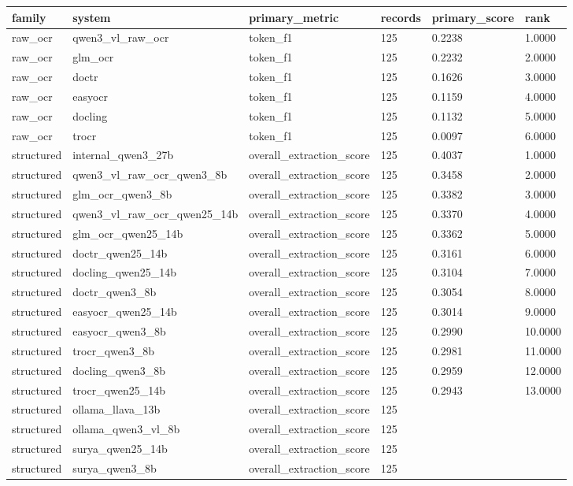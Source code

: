 \begin{tabular}{llllll}
\toprule
family & system & primary\_metric & records & primary\_score & rank \\
\midrule
raw\_ocr & qwen3\_vl\_raw\_ocr & token\_f1 & 125 & 0.2238 & 1.0000 \\
raw\_ocr & glm\_ocr & token\_f1 & 125 & 0.2232 & 2.0000 \\
raw\_ocr & doctr & token\_f1 & 125 & 0.1626 & 3.0000 \\
raw\_ocr & easyocr & token\_f1 & 125 & 0.1159 & 4.0000 \\
raw\_ocr & docling & token\_f1 & 125 & 0.1132 & 5.0000 \\
raw\_ocr & trocr & token\_f1 & 125 & 0.0097 & 6.0000 \\
structured & internal\_qwen3\_27b & overall\_extraction\_score & 125 & 0.4037 & 1.0000 \\
structured & qwen3\_vl\_raw\_ocr\_qwen3\_8b & overall\_extraction\_score & 125 & 0.3458 & 2.0000 \\
structured & glm\_ocr\_qwen3\_8b & overall\_extraction\_score & 125 & 0.3382 & 3.0000 \\
structured & qwen3\_vl\_raw\_ocr\_qwen25\_14b & overall\_extraction\_score & 125 & 0.3370 & 4.0000 \\
structured & glm\_ocr\_qwen25\_14b & overall\_extraction\_score & 125 & 0.3362 & 5.0000 \\
structured & doctr\_qwen25\_14b & overall\_extraction\_score & 125 & 0.3161 & 6.0000 \\
structured & docling\_qwen25\_14b & overall\_extraction\_score & 125 & 0.3104 & 7.0000 \\
structured & doctr\_qwen3\_8b & overall\_extraction\_score & 125 & 0.3054 & 8.0000 \\
structured & easyocr\_qwen25\_14b & overall\_extraction\_score & 125 & 0.3014 & 9.0000 \\
structured & easyocr\_qwen3\_8b & overall\_extraction\_score & 125 & 0.2990 & 10.0000 \\
structured & trocr\_qwen3\_8b & overall\_extraction\_score & 125 & 0.2981 & 11.0000 \\
structured & docling\_qwen3\_8b & overall\_extraction\_score & 125 & 0.2959 & 12.0000 \\
structured & trocr\_qwen25\_14b & overall\_extraction\_score & 125 & 0.2943 & 13.0000 \\
structured & ollama\_llava\_13b & overall\_extraction\_score & 125 &  &  \\
structured & ollama\_qwen3\_vl\_8b & overall\_extraction\_score & 125 &  &  \\
structured & surya\_qwen25\_14b & overall\_extraction\_score & 125 &  &  \\
structured & surya\_qwen3\_8b & overall\_extraction\_score & 125 &  &  \\
\bottomrule
\end{tabular}
